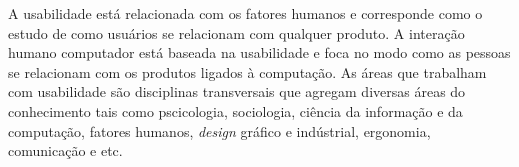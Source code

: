 A usabilidade está relacionada com os fatores humanos e corresponde como o estudo de como usuários se relacionam com qualquer produto. A interação humano computador está baseada na usabilidade e foca no modo como as pessoas se relacionam com os produtos ligados à computação.
%
As áreas que trabalham com usabilidade são disciplinas transversais que agregam diversas áreas do conhecimento tais como pscicologia, sociologia, ciência da informação e da computação, fatores humanos, \emph{design} gráfico e indústrial, ergonomia, comunicação e etc.
%

